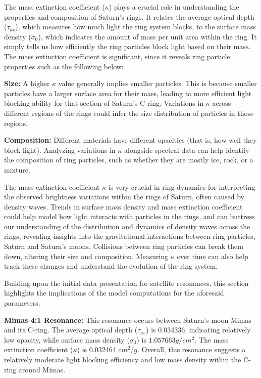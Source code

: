 \documentclass{article}
\begin{document}
The mass extinction coefficient ($\kappa$) plays a crucial role in understanding the properties and composition of Saturn's rings. It relates the average optical depth ($\tau_{av}$), which measures how much light the ring system blocks, to the surface mass density ($\sigma_{0}$), which indicates the amount of mass per unit area within the ring. It simply tells us how efficiently the ring particles block light based on their mass. The mass extinction coefficient is significant, since it reveals ring particle properties such as the following below:

\textbf{Size:} A higher $\kappa$ value generally implies smaller particles. This is because smaller particles have a larger surface area for their mass, leading to more efficient light blocking ability for that section of Saturn's C-ring. Variations in $\kappa$ across different regions of the rings could infer the size distribution of particles in those regions.

\textbf{Composition:} Different materials have different opacities (that is, how well they block light). Analyzing variations in $\kappa$ alongside spectral data can help identify the composition of ring particles, such as whether they are mostly ice, rock, or a mixture.

The mass extinction coefficient $\kappa$ is very crucial in ring dynamics for interpreting the observed brightness variations within the rings of Saturn, often caused by density waves. Trends in surface mass density and mass extinction coefficient could help model how light interacts with particles in the rings, and can buttress our understanding of the distribution and dynamics of density waves across the rings, revealing insights into the gravitational interactions between ring particles, Saturn and Saturn's moons. Collisions between ring particles can break them down, altering their size and composition. Measuring $\kappa$ over time can also help track these changes and understand the evolution of the ring system.

Building upon the initial data presentation for satellite resonances, this section highlights the implications of the model computations for the aforesaid parameters.

\textbf{Mimas 4:1 Resonance:}
This resonance occurs between Saturn's moon Mimas and its C-ring. The average optical depth ($\tau_{av}$) is 0.034336, indicating relatively low opacity, while surface mass density ($\sigma_{0}$) is $1.057663 g/cm^{2}$. The mass extinction coefficient ($\kappa$) is 0.032464 $cm^{2}/g$. Overall, this resonance suggests a relatively moderate light blocking efficiency and low mass density within the C-ring around Mimas.
\end{document}
